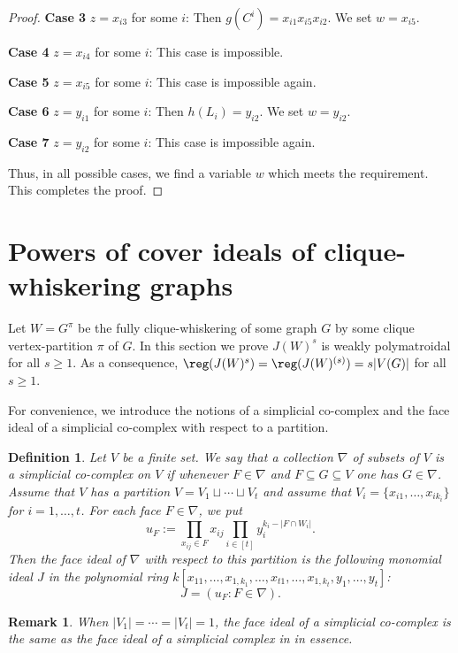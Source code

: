 \documentclass[12pt]{amsart}
\newtheorem{Remark}[Theorem]{Remark}
\newtheorem{Definition}[Theorem]{Definition}
\begin{document}
\begin{proof}
{\bf Case 3} $z=x_{i3}$ for some $i$: Then $g(C^i)=x_{i1}x_{i5}x_{i2}$. We set $w=x_{i5}$.

 {\bf Case 4} $z=x_{i4}$ for some $i$: This case is impossible.

{\bf Case 5} $z=x_{i5}$ for some $i$: This case is impossible again.

 {\bf Case 6} $z=y_{i1}$ for some $i$: Then $h(L_i)=y_{i2}$. We set $w=y_{i2}$.

 {\bf Case 7} $z=y_{i2}$ for some $i$:  This case is  impossible again.

 Thus, in all possible cases, we find a variable  $w$ which meets the requirement. This completes the proof.\end{proof}
\section{Powers of cover ideals of clique-whiskering graphs}

Let $W=G^{\pi}$ be the fully clique-whiskering of some graph $G$ by some clique vertex-partition $\pi$ of $G$. In this section we  prove  $J(W)^s$ is weakly polymatroidal for all $s\geq 1$.  As a consequence,  $\reg(J(W)^s)=\reg(J(W)^{(s)})=s|V(G)|$ for all $s\geq 1$.

For convenience, we introduce  the notions of a simplicial co-complex and the face ideal of a simplicial co-complex with respect to a partition.
\begin{Definition} \label{4.1}\em Let $V$ be a finite set.  We say that a collection $\nabla$ of subsets of $V$ is a {\it simplicial co-complex} on $V$  if whenever $F\in \nabla$ and $F\subseteq G\subseteq V$ one has $G\in \nabla$. Assume that $V$ has a partition $V=V_1\sqcup \cdots\sqcup V_t$ and assume that $V_i=\{x_{i1},\ldots,x_{ik_i}\}$ for $i=1,\ldots, t$. For each face $F\in \nabla$, we put $$u_F:=\prod_{x_{ij}\in F}x_{ij}\prod_{i\in [t]}y_i^{k_i-|F\cap W_i|}.$$ Then the face ideal of $\nabla$ with respect to this partition is the following monomial ideal $J$ in the polynomial ring $k[x_{11},\ldots,x_{1,k_1},\ldots,x_{t1},\ldots,x_{1,k_t},y_1,\ldots,y_t]$:
$$J=(u_F:F\in \nabla).$$






\end{Definition}

\begin{Remark}\em   When $|V_1|=\cdots=|V_t|=1$,  the face ideal of a simplicial co-complex is the same as the face ideal of a simplicial complex in \cite{HH1} in essence.
\end{Remark}
\end{document}
